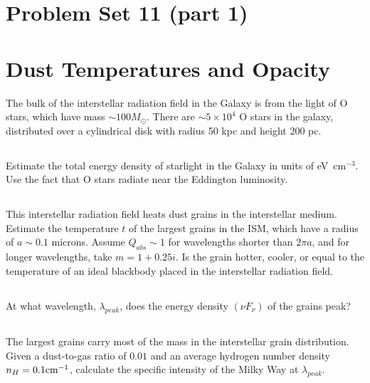\documentclass[11pt]{article}
\begin{document}
\pagestyle{empty}

\section*{\centering Problem Set 11 (part 1)}

\section{Dust Temperatures and Opacity}

The bulk of the interstellar radiation field in the Galaxy is from the light of
O stars, which have mass $\sim100M_\odot$.  There are $\sim5\times10^4$ O stars in the galaxy,
distributed over a cylindrical disk with radius 50 kpc and height 200 pc.

\subsection{}
Estimate the total energy density of starlight in the Galaxy in units of eV~cm$^{-3}$.
Use the fact that O stars radiate near the Eddington luminosity.

\subsection{}
This interstellar radiation field heats dust grains in the interstellar medium.
Estimate the temperature $t$ of the largest grains in the ISM, which have a radius
of $a\sim0.1$ microns.  Assume $Q_{abs}\sim1$ for wavelengths shorter than $2\pi a$,
and for longer wavelengths, take $m=1+0.25i$.
Is the grain hotter, cooler, or equal
to the temperature of an ideal blackbody placed in the interstellar radiation field.

\subsection{}
At what wavelength, $\lambda_{peak}$, does the energy density $(\nu F_\nu)$ of the grains peak?

\subsection{}
The largest grains carry most of the mass in the interstellar grain distribution.
Given a dust-to-gas ratio of $0.01$ and an average hydrogen number density
$n_H=0.1 {\rm cm}^{-1}$, calculate the specific intensity of the Milky Way
at $\lambda_{peak}$.
\end{document}

